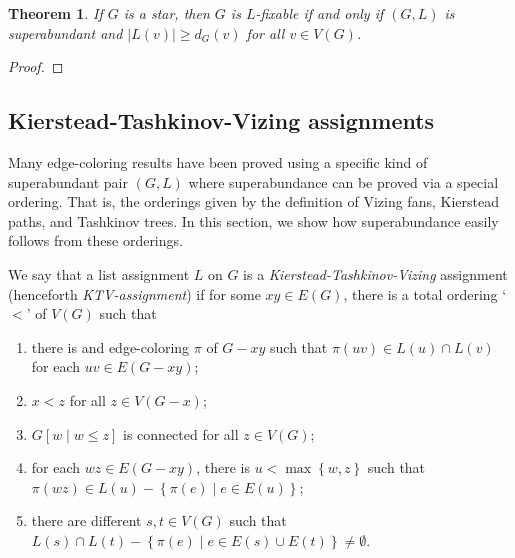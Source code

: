 \documentclass[12pt]{article}
\theoremstyle{plain}
\newtheorem{thm}{Theorem}[section]
\theoremstyle{definition}
\theoremstyle{remark}
\newcommand{\set}[1]{\left\{ #1 \right\}}
\newcommand{\setbs}[2]{\left\{ #1 \mid #2 \right\}}
\newcommand{\brackets}[1]{\left[ #1 \right]}
\begin{document}
\begin{thm}\label{FixabilityOfStars}
If $G$ is a star, then $G$ is $L$-fixable if and only if $(G, L)$ is superabundant and $|L(v)| \ge d_G(v)$ for all $v \in V(G)$.
\end{thm}
\begin{proof}
\end{proof}

\subsection{Kierstead-Tashkinov-Vizing assignments}
Many edge-coloring results have been proved using a specific kind of
superabundant pair $(G, L)$ where superabundance can be proved via a special
ordering. That is, the orderings given by the definition of Vizing fans,
Kierstead paths, and Tashkinov trees.  In this section, we show how
superabundance easily follows from these orderings.

We say that a list assignment $L$ on $G$ is a \emph{Kierstead-Tashkinov-Vizing} assignment (henceforth \emph{KTV-assignment}) if for some $xy \in E(G)$, there is a total ordering `$<$' of $V(G)$ such that

\begin{enumerate}
\item there is and edge-coloring $\pi$ of $G-xy$ such that $\pi(uv) \in L(u) \cap L(v)$ for each $uv \in E(G - xy)$; 
\item $x < z$ for all $z \in V(G - x)$; 
\item $G\brackets{w \mid w \le z}$ is connected for all $z \in V(G)$; 
\item for each $wz \in E(G - xy)$, there is $u < \max\set{w, z}$ such that $\pi(wz) \in L(u) - \setbs{\pi(e)}{e \in E(u)}$;
\item there are different $s, t \in V(G)$ such that $L(s) \cap L(t) - \setbs{\pi(e)}{e \in E(s) \cup E(t)} \ne \emptyset$.
\end{enumerate}
\end{document}
